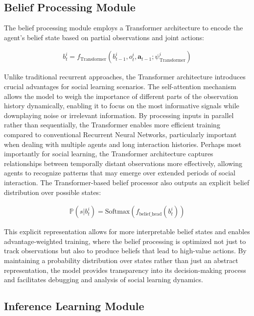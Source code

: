 \documentclass[a4paper,12pt]{report}
\begin{document}
\subsection{Belief Processing Module}

The belief processing module employs a Transformer architecture to encode the agent's belief state based on partial observations and joint actions:

\begin{align}
    b^i_t = f_{\text{Transformer}}(b^i_{t-1}, o^i_t, \boldsymbol{a}_{t-1}; \psi^i_{\text{Transformer}})
\end{align}

Unlike traditional recurrent approaches, the Transformer architecture introduces crucial advantages for social learning scenarios. The self-attention mechanism allows the model to weigh the importance of different parts of the observation history dynamically, enabling it to focus on the most informative signals while downplaying noise or irrelevant information. By processing inputs in parallel rather than sequentially, the Transformer enables more efficient training compared to conventional Recurrent Neural Networks, particularly important when dealing with multiple agents and long interaction histories. Perhaps most importantly for social learning, the Transformer architecture captures relationships between temporally distant observations more effectively, allowing agents to recognize patterns that may emerge over extended periods of social interaction. The Transformer-based belief processor also outputs an explicit belief distribution over possible states:

\begin{align}
    \mathbb{P}(s|b^i_t) = \text{Softmax}(f_{\text{belief\_head}}(b^i_t))
\end{align}

This explicit representation allows for more interpretable belief states and enables advantage-weighted training, where the belief processing is optimized not just to track observations but also to produce beliefs that lead to high-value actions. By maintaining a probability distribution over states rather than just an abstract representation, the model provides transparency into its decision-making process and facilitates debugging and analysis of social learning dynamics.

\subsection{Inference Learning Module}
\end{document}
